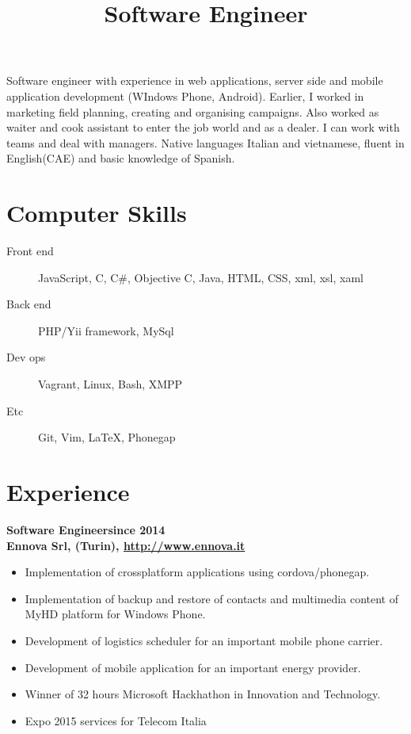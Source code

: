 \documentclass[a4paper,sans,10pt]{moderncv} %
\title{Software Engineer}
\newcommand{\experience}{Experience}
\newcommand{\skills}{Computer Skills}
\begin{document}
\maketitle

	\vspace{-1.5em}  %
\justify
Software engineer with experience in web applications, server side and mobile application development (WIndows Phone, Android).
Earlier, I worked in marketing field planning, creating and organising campaigns. Also worked as waiter and cook assistant to enter the job world and as a dealer.
I can work with teams and deal with managers.
Native languages Italian and vietnamese, fluent in English(CAE) and basic knowledge of Spanish.

\section{\skills}
\begin{description}
\item [Front end] JavaScript, C, C\#, Objective C, Java, HTML, CSS, xml, xsl, xaml
\item [Back end] PHP/Yii framework, MySql
\item [Dev ops] Vagrant, Linux, Bash, XMPP
\item [Etc] Git, Vim, LaTeX, Phonegap
\end{description}

  \section{\experience}

\renewcommand{\labelitemi}{\tiny$\blacksquare$}
  \textbf{Software Engineer}\hfill\textbf{since 2014}\\
  \textbf{Ennova Srl, (Turin), \url{http://www.ennova.it}}\\
\vspace{-1em}
  \begin{itemize}
  \item Implementation of crossplatform applications using cordova/phonegap.
  \item Implementation of backup and restore of contacts and multimedia content of MyHD platform for Windows Phone.
  \item Development of logistics scheduler for an important mobile phone carrier.
  \item Development of mobile application for an important energy provider.
  \item Winner of 32 hours Microsoft Hackhathon in Innovation and Technology.
\item Expo 2015 services for Telecom Italia
  \end{itemize}
\end{document}
